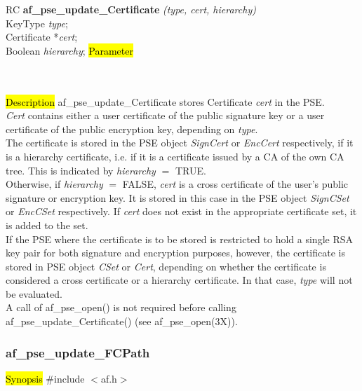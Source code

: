 RC {\bf af\_pse\_update\_Certificate} {\em (type, cert, hierarchy)} \\
KeyType {\em type}; \\
Certificate *{\em cert}; \\
Boolean {\em hierarchy};
\hl{Parameter}

 \\
 \\
\hl{Description}
af\_pse\_update\_Certificate stores Certificate {\em cert} in the PSE.
\\ [1em]
{\em Cert} contains either a user certificate of the public signature key 
or a user certificate of the public encryption key, depending on {\em type}.
\\ [1em]
The certificate is stored in the PSE object {\em SignCert} or 
{\em EncCert} respectively, if it is a hierarchy certificate, i.e. if it is a certificate
issued by a CA of the own CA tree. This is indicated by {\em hierarchy} $=$ TRUE. 
\\ [1em]
Otherwise, if {\em hierarchy} $=$ FALSE, {\em cert} is a cross certificate of the user's
public signature or encryption key. It is stored in this case in the PSE object {\em SignCSet} or 
{\em EncCSet} respectively.
If {\em cert} does not exist in the appropriate certificate set,
it is added to the set.
\\ [1em]
If the PSE where the certificate is to be stored is restricted to hold a single RSA key pair
for both signature and encryption purposes, however, the certificate is stored in PSE object {\em CSet} or {\em Cert},
depending on whether the certificate is considered a cross certificate or a hierarchy certificate. In that case, {\em type} will not
be evaluated.
\\ [1em]
A call of af\_pse\_open() is not required before calling af\_pse\_update\_Certificate()
(see af\_pse\_open(3X)).

\subsubsection{af\_pse\_update\_FCPath}
\label{af_update_FCPath}
\hl{Synopsis}
\#include $<$af.h$>$ 

